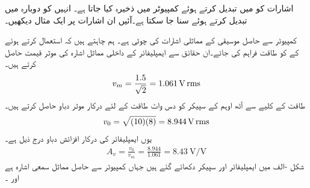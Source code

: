  اشارات کو  میں تبدیل کرتے ہوئے کمپیوٹر میں ذخیرہ کیا جاتا ہے۔ انہیں کو دوبارہ  میں تبدیل کرتے ہوئے سنا جا سکتا ہے۔آئیں ان اشارات پر ایک مثال دیکھیں۔

کمپیوٹر سے حاصل موسیقی کے مماثلی اشارات کی چوٹی  ہے۔ ہم چاہتے ہیں کہ  استعمال کرتے ہوئے  کے  کو  طاقت فراہم کی جائے۔ان حقائق سے ایمپلیفائر کے داخلی مماثل اشارہ کی موثر قیمت حاصل کرتے ہیں۔
\begin{align*}
v_m=\frac{1.5}{\sqrt{2}}=\SI{1.061}{\volt}\,{\textup{rms}}
\end{align*}
طاقت کے کلیے  سے آٹھ اوہم کے سپیکر کو دس واٹ طاقت کے لئے درکار موثر دباو حاصل کرتے ہیں۔
\begin{align*}
v_0=\sqrt{(10)(8)}=\SI{8.944}{\volt}\,{\textup{rms}}
\end{align*} 
یوں ایمپلیفائر کی درکار افزائش دباو درج ذیل ہے۔
\begin{align*}
A_v=\frac{v_0}{v_m}=\frac{8.944}{1.061}=\SI{8.43}{\volt\per\volt}
\end{align*}
شکل -الف میں  ایمپلیفائر اور سپیکر دکھائے گئے ہیں جہاں  کمپیوٹر سے حاصل مماثل سمعی اشارہ ہے اور ۔
